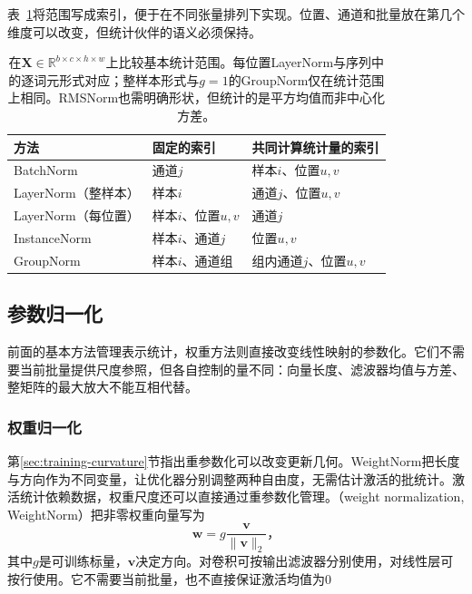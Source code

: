 表~\ref{tab:training-normalization-axes}将范围写成索引，便于在不同张量排列下实现。位置、通道和批量放在第几个维度可以改变，但统计伙伴的语义必须保持。
\begin{table}[htbp]
  \centering\small
  \begin{tabularx}{\linewidth}{@{}p{35mm}p{43mm}X@{}}
    \toprule
    方法 & 固定的索引 & 共同计算统计量的索引 \\
    \midrule
    BatchNorm & 通道$j$ & 样本$i$、位置$u,v$ \\
    LayerNorm（整样本） & 样本$i$ & 通道$j$、位置$u,v$ \\
    LayerNorm（每位置） & 样本$i$、位置$u,v$ & 通道$j$ \\
    InstanceNorm & 样本$i$、通道$j$ & 位置$u,v$ \\
    GroupNorm & 样本$i$、通道组 & 组内通道$j$、位置$u,v$ \\
    \bottomrule
  \end{tabularx}
  \caption{在$\bm X\in\mathbb R^{b\times c\times h\times w}$上比较基本统计范围。每位置LayerNorm与序列中的逐词元形式对应；整样本形式与$g=1$的GroupNorm仅在统计范围上相同。RMSNorm也需明确形状，但统计的是平方均值而非中心化方差。}
  \label{tab:training-normalization-axes}
\end{table}
\FloatBarrier

\subsection{参数归一化}
\label{sec:training-parameter-normalization-methods}
\label{sec:training-weight-normalization-methods}
前面的基本方法管理表示统计，权重方法则直接改变线性映射的参数化。它们不需要当前批量提供尺度参照，但各自控制的量不同：向量长度、滤波器均值与方差、整矩阵的最大放大不能互相代替。

\subsubsection{权重归一化}
\label{sec:training-weightnorm}
第\ref{sec:training-curvature}节指出重参数化可以改变更新几何。WeightNorm把长度与方向作为不同变量，让优化器分别调整两种自由度，无需估计激活的批统计。激活统计依赖数据，权重尺度还可以直接通过重参数化管理。（weight normalization, WeightNorm）把非零权重向量写为
\begin{equation}
  \bm w=g\frac{\bm v}{\lVert\bm v\rVert_2}\text{，}
  \label{eq:training-weightnorm}
\end{equation}
其中$g$是可训练标量，$\bm v$决定方向。对卷积可按输出滤波器分别使用，对线性层可按行使用。它不需要当前批量，也不直接保证激活均值为0

